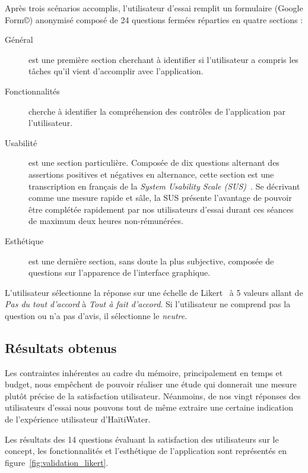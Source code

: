 \documentclass{EPL-master-thesis-covers-FR}
\begin{document}
				Après trois scénarios accomplis, l'utilisateur d'essai remplit un formulaire (Google Form\copyright) anonymisé composé de 24 questions fermées réparties en quatre sections :
				\begin{description}
					\item[Général] est une première section cherchant à identifier si l'utilisateur a compris les tâches qu'il vient d'accomplir avec l'application.
					\item[Fonctionnalités] cherche à identifier la compréhension des contrôles de l'application par l'utilisateur.
					\item[Usabilité] est une section particulière. Composée de dix questions alternant des assertions positives et négatives en alternance, cette section est une transcription en français de la \emph{System Usability Scale (SUS)}~\cite{ref:sus}. Se décrivant comme une mesure rapide et sâle, la SUS présente l'avantage de pouvoir être complétée rapidement par nos utilisateurs d'essai durant ces séances de maximum deux heures non-rémunérées.
					\item[Esthétique] est une dernière section, sans doute la plus subjective, composée de questions sur l'apparence de l'interface graphique.
				\end{description}

				L'utilisateur sélectionne la réponse sur une échelle de Likert~\cite{ref:wikipedia_likert_scale} à 5 valeurs allant de \emph{Pas du tout d'accord} à \emph{Tout à fait d'accord}. Si l'utilisateur ne comprend pas la question ou n'a pas d'avis, il sélectionne le \emph{neutre}.

			\subsection*{Résultats obtenus}

				Les contraintes inhérentes au cadre du mémoire, principalement en temps et budget, nous empêchent de pouvoir réaliser une étude qui donnerait une mesure plutôt précise de la satisfaction utilisateur. Néanmoins, de nos vingt réponses des utilisateurs d'essai nous pouvons tout de même extraire une certaine indication de l'expérience utilisateur d'HaïtiWater.

				Les résultats des 14 questions évaluant la satisfaction des utilisateurs sur le concept, les fonctionnalités et l'esthétique de l'application sont représentés en figure~\ref{fig:validation_likert}.
\end{document}
